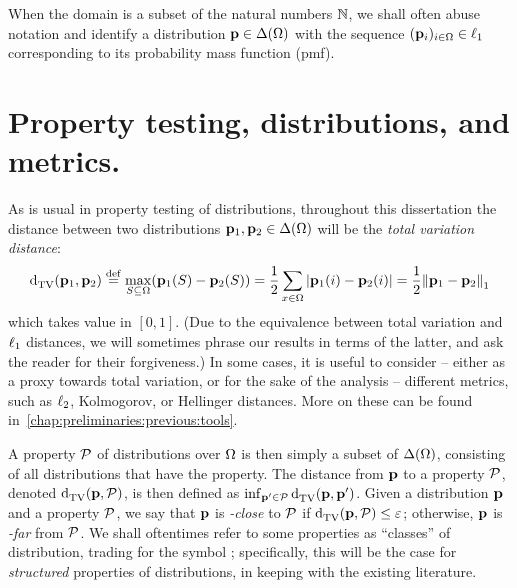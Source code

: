 When the domain is a subset of the natural numbers $\N$, we shall often abuse notation and identify a distribution $\p\in\distribs{\domain[\Omega]}$ with the sequence $(\p_i)_{i\in\domain}\in\lp[1]$ corresponding to its probability mass function (pmf).

\section{Property testing, distributions, and metrics.} 

As is usual in property testing of distributions, throughout this dissertation the distance between two distributions $\D_1, \D_2\in \distribs{\domain}$ will be the \emph{total variation distance}:
\begin{equation}\label{def:distance:tv}
\totalvardist{\D_1}{\D_2 } \eqdef \max_{S \subseteq \domain} (\D_1(S)-\D_2(S)) = \frac{1}{2} \sum_{x \in \domain}\abs{\D_1(i)-\D_2(i)} = \frac{1}{2} \normone{\D_1 - \D_2}
\end{equation}
which takes value in $[0,1]$. (Due to the equivalence between total variation and $\lp[1]$ distances, we will sometimes phrase our results in terms of the latter, and ask the reader for their forgiveness.) In some cases, it is useful to consider -- either as a proxy towards total variation, or for the sake of the analysis -- different metrics, such as $\lp[2]$, Kolmogorov, or Hellinger distances. More on these can be found in~\cref{chap:preliminaries:previous:tools}.

A property $\property$ of distributions over $\domain$ is then simply a subset of $\distribs{\domain}$, consisting of all distributions that have the property. The distance from $\D$ to a property $\property$, denoted $\totalvardist{\D}{\property}$, is then defined as $\inf_{\D^\prime \in \property} \totalvardist{\D}{\D^\prime}$. Given a distribution $\D$ and a property $\property$, we say that $\D$ is \emph{\eps-close} to $\property$ if $\totalvardist{\D}{\property}\leq \eps$; otherwise, $\D$ is \emph{\eps-far} from $\property$. We shall oftentimes refer to some properties as ``classes'' of distribution, trading \property for the symbol \class; specifically, this will be the case for \emph{structured} properties of distributions, in keeping with the existing literature.

